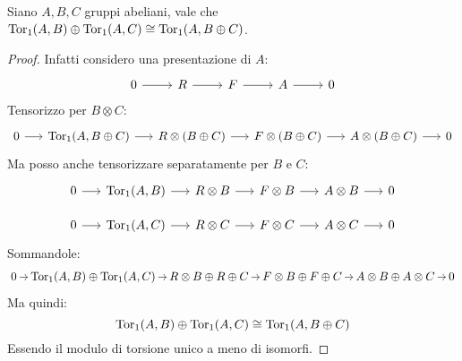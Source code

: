 \begin{lemma}
  Siano $ A, B, C $ gruppi abeliani, vale che $  \mathrm{Tor_1}( A, B) \oplus \mathrm{Tor_1}( A, C) \cong \mathrm{Tor_1}( A, B \oplus C) $.
\end{lemma}
\begin{proof}
  Infatti considero una presentazione di $ A $:
  \[
    \begin{tikzcd}
      0 \rar & R \rar & F \rar & A \rar & 0
    \end{tikzcd}
  \]
  Tensorizzo per $ B \otimes C $:
  \[
    \begin{tikzcd}[nodes = {column sep = 15pt}]
      0 \rar & \tor{A, B \oplus C} \rar & R \otimes (B \oplus C) \rar & F \otimes (B \oplus C)\rar & A \otimes (B \oplus C) \rar & 0
    \end{tikzcd}
  \]
  Ma posso anche tensorizzare separatamente per $ B $ e $ C $:
  \[
    \begin{tikzcd}[nodes = {column sep = 15pt, row sep = 10 pt}]
      0 \rar & \tor{A, B } \rar & R \otimes B \rar & F \otimes B \rar & A \otimes B \rar & 0 \\
      0 \rar & \tor{A, C} \rar & R \otimes C \rar & F \otimes C \rar & A \otimes C \rar & 0
    \end{tikzcd}
  \]
  Sommandole:
  \[
    \begin{tikzcd}[nodes = {column sep = 8pt, inner sep = 2pt, outer sep = 0.5pt}]
      0 \rar & \tor{A, B} \oplus \tor{A, C} \rar & R \otimes B \oplus R \oplus C \rar & F \otimes B \oplus F \oplus C \rar & A \otimes B \oplus A \otimes C  \rar & 0
    \end{tikzcd}
  \]
  Ma quindi:
  \[
    \mathrm{Tor_1}( A, B) \oplus \mathrm{Tor_1}( A, C) \cong \mathrm{Tor_1}( A, B \oplus C)
  \]
  Essendo il modulo di torsione unico a meno di isomorfi.
 \end{proof}


